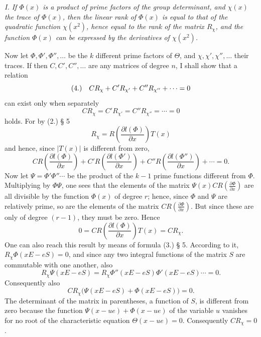 \documentclass[11pt]{article}
\newcommand{\fnum}[1]{\textup{(\ensuremath{#1}.)}\quad}
\begin{document}
\emph{I. If $\Phi(x)$ is a product of prime factors of the group determinant, and $\chi(x)$ the trace of $\Phi(x)$, then the linear rank of $\Phi(x)$ is equal to that of the quadratic function $\chi(x^2)$, hence equal to the rank of the matrix $R_\chi$, and the function $\Phi(x)$ can be expressed by the derivatives of $\chi(x^2)$.}

Now let $\Phi,\Phi',\Phi'',\ldots$ be the $k$ different prime factors of $\Theta$, and $\chi,\chi',\chi'',\ldots$ their traces. If then $C,C',C'',\ldots$ are any matrices of degree $n$, I shall show that a relation
\[
\fnum{4} CR_\chi+C'R_{\chi'}+C''R_{\chi''}+\cdots=0
\]
can exist only when separately
\[
 CR_\chi=C'R_{\chi'}=C''R_{\chi''}=\cdots=0
\]
holds. For by (2.) § 5
\[
 R_\chi=R\!\left(\frac{\partial l(\Phi)}{\partial x}\right)T(x)
\]
and hence, since $|T(x)|$ is different from zero,
\[
 CR\!\left(\frac{\partial l(\Phi)}{\partial x}\right)
+C'R\!\left(\frac{\partial l(\Phi')}{\partial x}\right)
+C''R\!\left(\frac{\partial l(\Phi'')}{\partial x}\right)+\cdots=0.
\]
Now let $\Psi=\Phi'\Phi''\cdots$ be the product of the $k-1$ prime functions different from $\Phi$. Multiplying by $\Phi\Psi$, one sees that the elements of the matrix $\Psi(x)CR\!\left(\frac{\partial\Phi}{\partial x}\right)$ are all divisible by the function $\Phi(x)$ of degree $r$; hence, since $\Phi$ and $\Psi$ are relatively prime, so are the elements of the matrix $CR\!\left(\frac{\partial\Phi}{\partial x}\right)$. But since these are only of degree $(r-1)$, they must be zero. Hence
\[
 0=CR\!\left(\frac{\partial l(\Phi)}{\partial x}\right)T(x)=CR_\chi.
\]
One can also reach this result by means of formula (3.) § 5. According to it, $R_\chi\Phi(xE-eS)=0$, and since any two integral functions of the matrix $S$ are commutable with one another, also
\[
 R_\chi\Psi(xE-eS)=R_\chi\Phi''(xE-eS)\Phi'(xE-eS)\cdots=0.
\]
Consequently also
\[
 CR_\chi\bigl(\Psi(xE-eS)+\Phi(xE-eS)\bigr)=0.
\]
The determinant of the matrix in parentheses, a function of $S$, is different from zero because the function $\Psi(x-ue)+\Phi(x-ue)$ of the variable $u$ vanishes for no root of the characteristic equation $\Theta(x-ue)=0$. Consequently $CR_\chi=0$.
\end{document}
